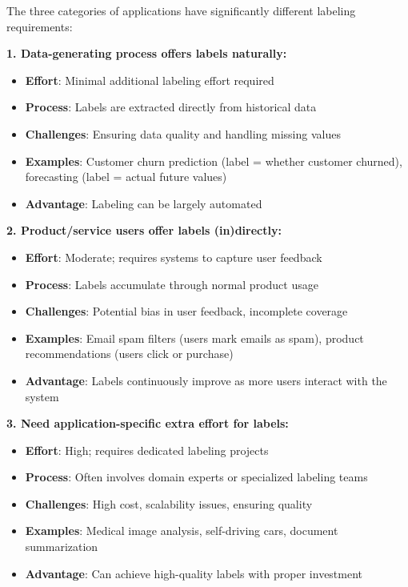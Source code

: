 \documentclass[12pt]{article}
\begin{document}
\begin{enumerate}
    \begin{tcolorbox}[colback=blue!5!white,colframe=blue!75!black,title={Solution}]
    The three categories of applications have significantly different labeling requirements:
    
    \textbf{1. Data-generating process offers labels naturally:}
    \begin{itemize}
        \item \textbf{Effort}: Minimal additional labeling effort required
        \item \textbf{Process}: Labels are extracted directly from historical data
        \item \textbf{Challenges}: Ensuring data quality and handling missing values
        \item \textbf{Examples}: Customer churn prediction (label = whether customer churned), forecasting (label = actual future values)
        \item \textbf{Advantage}: Labeling can be largely automated
    \end{itemize}
    
    \textbf{2. Product/service users offer labels (in)directly:}
    \begin{itemize}
        \item \textbf{Effort}: Moderate; requires systems to capture user feedback
        \item \textbf{Process}: Labels accumulate through normal product usage
        \item \textbf{Challenges}: Potential bias in user feedback, incomplete coverage
        \item \textbf{Examples}: Email spam filters (users mark emails as spam), product recommendations (users click or purchase)
        \item \textbf{Advantage}: Labels continuously improve as more users interact with the system
    \end{itemize}
    
    \textbf{3. Need application-specific extra effort for labels:}
    \begin{itemize}
        \item \textbf{Effort}: High; requires dedicated labeling projects
        \item \textbf{Process}: Often involves domain experts or specialized labeling teams
        \item \textbf{Challenges}: High cost, scalability issues, ensuring quality
        \item \textbf{Examples}: Medical image analysis, self-driving cars, document summarization
        \item \textbf{Advantage}: Can achieve high-quality labels with proper investment
    \end{itemize}
    

\end{tcolorbox}
\end{enumerate}
\end{document}
